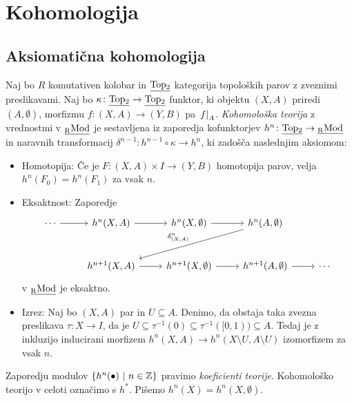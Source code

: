 \section{Kohomologija}

\subsection{Aksiomatična kohomologija}


\begin{definicija}
Naj bo $R$ komutativen kolobar in $\underline{\operatorname{Top_2}}$ kategorija
topoloških parov z zveznimi preslikavami. Naj bo
$\kappa \colon \underline{\operatorname{Top_2}} \to \underline{\operatorname{Top_2}}$ funktor, ki objektu
$(X, A)$ priredi $(A, \emptyset)$, morfizmu
$f \colon (X, A) \to (Y, B)$ pa $\left. f\right|_{A}^{}$.
\emph{Kohomološka teorija} z vrednostmi
v $\underline{\operatorname{_{R}Mod}}$ je sestavljena iz zaporedja kofunktorjev
$h^n \colon \underline{\operatorname{Top_2}} \to \underline{\operatorname{_RMod}}$ in naravnih
transformacij $\delta^{n-1} \colon h^{n-1} \circ \kappa \to h^n$,
ki zadošča naslednjim aksiomom:

\begin{itemize}
\item Homotopija: Če je $F \colon (X, A) \times I \to (Y, B)$
homotopija parov, velja $h^n(F_0) = h^n(F_1)$ za vsak $n$.
\item Eksaktnost: Zaporedje
\[
\begin{tikzcd}[row sep=large]
\cdots \arrow[r] &
h^n(X, A) \arrow[r] &
h^n(X, \emptyset) \arrow[r] &
h^n(A, \emptyset) \arrow[lld, "\delta_{(X,A)}^n"'] \\&
h^{n+1}(X, A) \arrow[r] &
h^{n+1}(X, \emptyset) \arrow[r] &
h^{n+1}(A, \emptyset) \arrow[r] &
\cdots
\end{tikzcd}
\]
v $\underline{\operatorname{_RMod}}$ je eksaktno.
\item Izrez: Naj bo $(X, A)$ par in $U \subseteq A$. Denimo, da
obstaja taka zvezna preslikava $\tau \colon X \to I$, da je
$U \subseteq \tau^{-1}(0) \subseteq \tau^{-1}([0,1)) \subseteq A$.
Tedaj je z inkluzijo inducirani morfizem
$h^n(X, A) \to h^n(X \setminus U, A \setminus U)$ izomorfizem za
vsak $n$.
\end{itemize}

Zaporedju modulov $\left\{h^n(\bullet)~\middle\vert~n \in \mathbb{Z}\right\}$ pravimo
\emph{koeficienti teorije}.
Kohomološko teorijo v celoti označimo s $h^*$. Pišemo
$h^n(X) = h^n(X, \emptyset)$.
\end{definicija}

